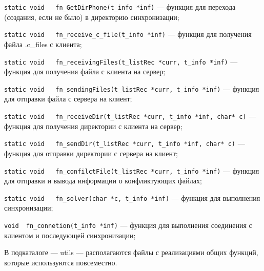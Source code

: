 \begin{enumerate}
	\verb|static void	fn_GetDirPhone(t_info *inf)| --- функция для перехода (создания, если не было) в директорию синхронизации;
	
	\verb|static void	fn_receive_c_file(t_info *inf)| --- функция для получения файла .c\_files с клиента;
	
	\verb|static void	fn_receivingFiles(t_listRec *curr, t_info *inf)| --- функция для получения файла с клиента на сервер;
	
	\verb|static void	fn_sendingFiles(t_listRec *curr, t_info *inf)| --- функция для отправки файла с сервера на клиент;
	
	\verb|static void	fn_receiveDir(t_listRec *curr, t_info *inf, char* c)| --- функция для получения директории с клиента на сервер;
	
	\verb|static void	fn_sendDir(t_listRec *curr, t_info *inf, char* c)| --- функция для отправки директории с сервера на клиент;
	
	\verb|static void	fn_confilctFile(t_listRec *curr, t_info *inf)| --- функция для отправки и вывода информации о конфликтующих файлах;
	
	\verb|static void	fn_solver(char *c, t_info *inf)| --- функция для выполнения синхронизации;
	
	\verb|void	fn_connetion(t_info *inf)| --- функция для выполнения соединения с клиентом и последующей синхронизации;
\end{enumerate}
В подкаталоге --- utils --- располагаются файлы с реализациями общих функций, которые используются повсеместно.

